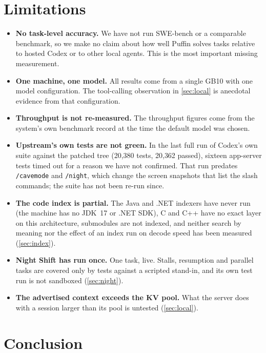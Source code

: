 \documentclass[11pt]{article}
\newcommand{\code}[1]{\texttt{#1}}
\begin{document}
\section{Limitations}
\label{sec:limits}

\begin{itemize}
  \item \textbf{No task-level accuracy.} We have not run SWE-bench or a comparable benchmark, so we
    make no claim about how well Puffin solves tasks relative to hosted Codex or to other local
    agents. This is the most important missing measurement.
  \item \textbf{One machine, one model.} All results come from a single GB10 with one model
    configuration. The tool-calling observation in \cref{sec:local} is anecdotal evidence from that
    configuration.
  \item \textbf{Throughput is not re-measured.} The throughput figures come from the system's own
    benchmark record at the time the default model was chosen.
  \item \textbf{Upstream's own tests are not green.} In the last full run of Codex's own suite
    against the patched tree (20{,}380 tests, 20{,}362 passed), sixteen app-server tests timed out
    for a reason we have not confirmed. That run predates \code{/cavemode} and \code{/night},
    which change the screen snapshots that list the slash commands; the suite has not been re-run
    since.
  \item \textbf{The code index is partial.} The Java and .NET indexers have never run (the machine
    has no JDK~17 or .NET SDK), C and C++ have no exact layer on this architecture, submodules are
    not indexed, and neither search by meaning nor the effect of an index run on decode speed has
    been measured (\cref{sec:index}).
  \item \textbf{Night Shift has run once.} One task, live. Stalls, resumption and parallel tasks
    are covered only by tests against a scripted stand-in, and its own test run is not sandboxed
    (\cref{sec:night}).
  \item \textbf{The advertised context exceeds the KV pool.} What the server does with a session
    larger than its pool is untested (\cref{sec:local}).
\end{itemize}

\section{Conclusion}
\end{document}
